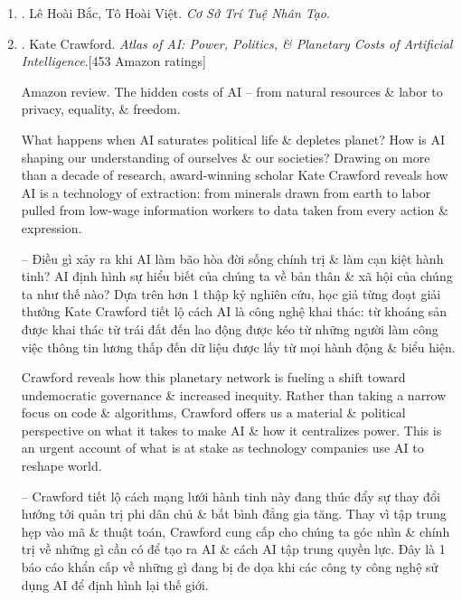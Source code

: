 \documentclass{article}
\begin{document}
\begin{enumerate}
	\item \cite{Bac_Viet_AI}. {\sc Lê Hoài Bắc, Tô Hoài Việt}. {\it Cơ Sở Trí Tuệ Nhân Tạo}.\hfill{\sf[done]}

    \item \cite{Crawford_AI_atlas}. {\sc Kate Crawford}. {\it Atlas of AI: Power, Politics, \& Planetary Costs of Artificial Intelligence}.\hfill[453 Amazon ratings]

    {\sf Amazon review.} The hidden costs of AI -- from natural resources \& labor to privacy, equality, \& freedom.

    What happens when AI saturates political life \& depletes planet? How is AI shaping our understanding of ourselves \& our societies? Drawing on more than a decade of research, award-winning scholar {\sc Kate Crawford} reveals how AI is a technology of extraction: from minerals drawn from earth to labor pulled from low-wage information workers to data taken from every action \& expression.

    -- Điều gì xảy ra khi AI làm bão hòa đời sống chính trị \& làm cạn kiệt hành tinh? AI định hình sự hiểu biết của chúng ta về bản thân \& xã hội của chúng ta như thế nào? Dựa trên hơn 1 thập kỷ nghiên cứu, học giả từng đoạt giải thưởng {\sc Kate Crawford} tiết lộ cách AI là công nghệ khai thác: từ khoáng sản được khai thác từ trái đất đến lao động được kéo từ những người làm công việc thông tin lương thấp đến dữ liệu được lấy từ mọi hành động \& biểu hiện.

    {\sc Crawford} reveals how this planetary network is fueling a shift toward undemocratic governance \& increased inequity. Rather than taking a narrow focus on code \& algorithms, {\sc Crawford} offers us a material \& political perspective on what it takes to make AI \& how it centralizes power. This is an urgent account of what is at stake as technology companies use AI to reshape world.

    -- {\sc Crawford} tiết lộ cách mạng lưới hành tinh này đang thúc đẩy sự thay đổi hướng tới quản trị phi dân chủ \& bất bình đẳng gia tăng. Thay vì tập trung hẹp vào mã \& thuật toán, {\sc Crawford} cung cấp cho chúng ta góc nhìn \& chính trị về những gì cần có để tạo ra AI \& cách AI tập trung quyền lực. Đây là 1 báo cáo khẩn cấp về những gì đang bị đe dọa khi các công ty công nghệ sử dụng AI để định hình lại thế giới.


\end{enumerate}
\end{document}
